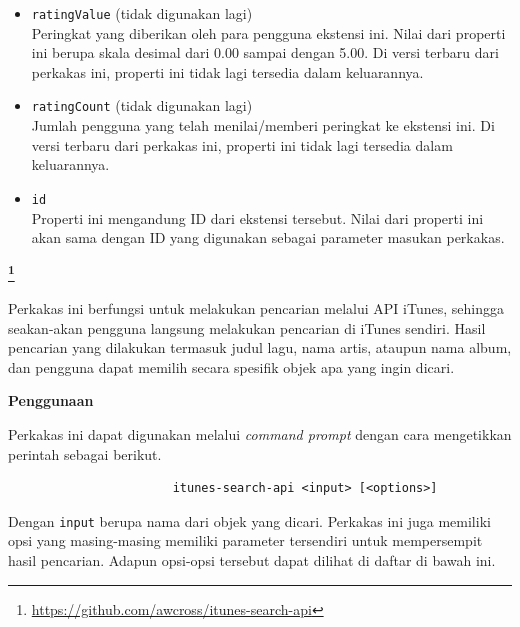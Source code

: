 \documentclass[a4paper,twoside]{article}
\begin{document}
\begin{enumerate}
\begin{itemize}
	\item \verb|ratingValue| (tidak digunakan lagi)\\
	Peringkat yang diberikan oleh para pengguna ekstensi ini. Nilai dari properti ini berupa skala desimal dari 0.00 sampai dengan 5.00. Di versi terbaru dari perkakas ini, properti ini tidak lagi tersedia dalam keluarannya.
	\item \verb|ratingCount| (tidak digunakan lagi)\\
	Jumlah pengguna yang telah menilai/memberi peringkat ke ekstensi ini. Di versi terbaru dari perkakas ini, properti ini tidak lagi tersedia dalam keluarannya.
	\item \verb|id|\\
	Properti ini mengandung ID dari ekstensi tersebut. Nilai dari properti ini akan sama dengan ID yang digunakan sebagai parameter masukan perkakas.
\end{itemize}

\vspace{\baselineskip}
\textbf{\large{\itunesapi}\footnote{\href{https://github.com/awcross/itunes-search-api}{https://github.com/awcross/itunes-search-api}}}
\label{sec:similarapps-itunesapi}

Perkakas \cl ini berfungsi untuk melakukan pencarian melalui API iTunes, sehingga seakan-akan pengguna langsung melakukan pencarian di iTunes sendiri. Hasil pencarian yang dilakukan termasuk judul lagu, nama artis, ataupun nama album, dan pengguna dapat memilih secara spesifik objek apa yang ingin dicari.

\textbf{Penggunaan}
\label{sec:similarapps-itunesapi-usage}

Perkakas ini dapat digunakan melalui \textit{command prompt} dengan cara mengetikkan perintah sebagai berikut.

\begin{verbatim}
                       itunes-search-api <input> [<options>]
\end{verbatim}

Dengan \verb|input| berupa nama dari objek yang dicari. Perkakas ini juga memiliki opsi yang masing-masing memiliki parameter tersendiri untuk mempersempit hasil pencarian. Adapun opsi-opsi tersebut dapat dilihat di daftar di bawah ini.


\end{enumerate}
\end{document}

